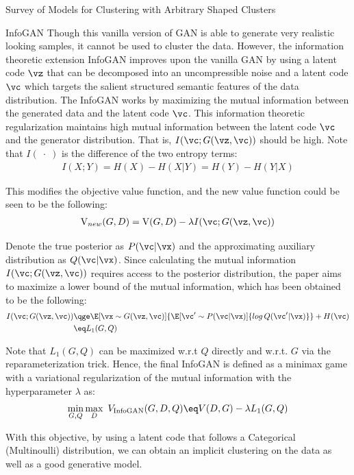 \documentclass{article}
\begin{document}
\begin{psection}{Survey of Models for Clustering with Arbitrary Shaped Clusters}
\begin{psubsection}{InfoGAN}
		Though this vanilla version of GAN is able to generate very realistic looking samples, it cannot be used to cluster the data. However, the information theoretic extension InfoGAN improves upon the vanilla GAN by using a latent code $\vz$ that can be decomposed into an uncompressible noise and a latent code $\vc$ which targets the salient structured semantic features of the data distribution. The InfoGAN works by maximizing the mutual information between the generated data and the latent code $\vc$. This information theoretic regularization maintains high mutual information between the latent code $\vc$ and the generator distribution. That is, $I(\vc;G(\vz,\vc))$ should be high. Note that $I(\;\cdot\;)$ is the difference of the two entropy terms:
		\begin{align*}
			I(X;Y) = H(X) - H(X|Y) = H(Y) - H(Y|X)
		\end{align*}

		This modifies the objective value function, and the new value function could be seen to be the following:
		\begin{align*}
			\text{V}_{new}(G,D) = \text{V}(G,D) - \lambda I(\vc;G(\vz,\vc))
		\end{align*}

		Denote the true posterior as $P(\vc|\vx)$ and the approximating auxiliary distribution as $Q(\vc|\vx)$. Since calculating the mutual information $I(\vc;G(\vz,\vc))$ requires access to the posterior distribution, the paper aims to maximize a lower bound of the mutual information, which has been obtained to be the following:
		\begin{align*}
			I(\vc;G(\vz,\vc)) &\qge \E[\vx\sim G(\vz,\vc)]{\E[\vc' \sim P(\vc|\vx)]{log\, Q(\vc'|\vx)}} + H(\vc) \\
			&\eq					L_1(G, Q)
		\end{align*}

		Note that $L_1(G,Q)$ can be maximized w.r.t $Q$ directly and w.r.t. $G$ via the reparameterization trick. Hence, the final InfoGAN is defined as a minimax game with a variational regularization of the mutual information with the hyperparameter $\lambda$ as:
		\begin{align*}
			\min_{G,Q} \max_D \ V_{\text{InfoGAN}}(G,D,Q) \eq V(D,G) - \lambda L_1(G,Q)
		\end{align*}

		With this objective, by using a latent code that follows a Categorical (Multinoulli) distribution, we can obtain an implicit clustering on the data as well as a good generative model.
	\end{psubsection}


\end{psection}
\end{document}
